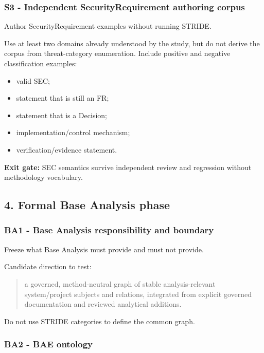 \documentclass[
  11pt,
  a4paper,
]{article}
\providecommand{\tightlist}{%
  \setlength{\itemsep}{0pt}\setlength{\parskip}{0pt}}
\begin{document}
\subsubsection{S3 - Independent SecurityRequirement authoring
corpus}\label{s3---independent-securityrequirement-authoring-corpus}

Author SecurityRequirement examples without running STRIDE.

Use at least two domains already understood by the study, but do not
derive the corpus from threat-category enumeration. Include positive and
negative classification examples:

\begin{itemize}
\tightlist
\item
  valid SEC;
\item
  statement that is still an FR;
\item
  statement that is a Decision;
\item
  implementation/control mechanism;
\item
  verification/evidence statement.
\end{itemize}

\textbf{Exit gate:} SEC semantics survive independent review and
regression without methodology vocabulary.

\subsection{4. Formal Base Analysis
phase}\label{formal-base-analysis-phase}

\subsubsection{BA1 - Base Analysis responsibility and
boundary}\label{ba1---base-analysis-responsibility-and-boundary}

Freeze what Base Analysis must provide and must not provide.

Candidate direction to test:

\begin{quote}
a governed, method-neutral graph of stable analysis-relevant
system/project subjects and relations, integrated from explicit governed
documentation and reviewed analytical additions.
\end{quote}

Do not use STRIDE categories to define the common graph.

\subsubsection{BA2 - BAE ontology}\label{ba2---bae-ontology}
\end{document}
